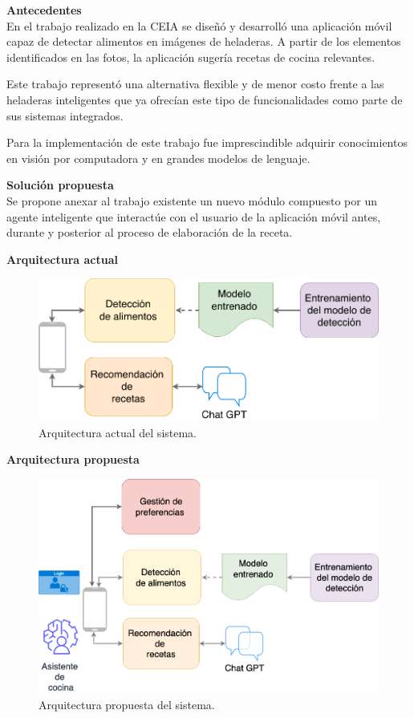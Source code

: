 \documentclass[
11pt, %
]{charter}
\begin{document}
\textbf{Antecedentes} \\
En el trabajo realizado en la CEIA se diseñó y desarrolló una aplicación móvil capaz de detectar alimentos en imágenes de heladeras. A partir de los elementos identificados en las fotos, la aplicación sugería recetas de cocina relevantes.

Este trabajo representó una alternativa flexible y de menor costo frente a las heladeras inteligentes que ya ofrecían este tipo de funcionalidades como parte de sus sistemas integrados.

Para la implementación de este trabajo fue imprescindible adquirir conocimientos en visión por computadora y en grandes modelos de lenguaje.


\textbf{Solución propuesta} \\
Se propone anexar al trabajo existente un nuevo módulo compuesto por un agente inteligente que interactúe con el usuario de la aplicación móvil antes, durante y posterior al proceso de elaboración de la receta.

\textbf{Arquitectura actual}

 \begin{figure}[H]
 \centering 
\includegraphics[width=.8\textwidth]{./Figuras/DiagramaGeneralActual.png}
 \caption{Arquitectura actual del sistema.}
 \label{fig:arquitectura-actual}
 \end{figure}

 \newpage
\textbf{Arquitectura propuesta}

\begin{figure}[H]
\centering 
\includegraphics[width=.8\textwidth]{./Figuras/DiagramaGeneral.png}
\caption{Arquitectura propuesta del sistema.}
\label{fig:arquitectura-propuesta}
\end{figure}
\end{document}

